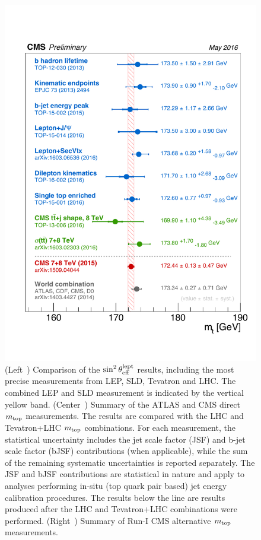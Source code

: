 \documentclass{blois}
\begin{document}
\begin{figure}
\begin{minipage}{0.25\linewidth}
\centerline{\includegraphics[width=1.00\linewidth]{figures/mtopComb_alt1}}
\end{minipage}
\caption[]{(Left~\cite{bib:LHCb-fb-asymmetry}) Comparison of the $\sin^2\theta_{\rm eff}^{\rm lept}$ results, including
the most precise measurements from LEP, SLD, Tevatron and LHC. The combined LEP and
SLD measurement is indicated by the vertical yellow band.
(Center~\cite{bib:LHCTopWG-topMass}) Summary of the ATLAS and CMS direct $m_{\rm top}$ measurements. The
results are compared with the LHC and Tevatron+LHC $m_{\rm top}$ combinations.
For each measurement, the statistical uncertainty includes the jet scale factor
(JSF) and b-jet scale factor (bJSF) contributions (when applicable), while the
sum of the remaining systematic uncertainties is reported separately. The JSF
and bJSF contributions are statistical in nature and apply to analyses performing
in-situ (top quark pair based) jet energy calibration procedures. The results
below the line are results produced after the LHC and Tevatron+LHC combinations
were performed.
(Right~\cite{bib:CMS-topMassAlternative}) Summary of Run-I CMS alternative $m_{\rm top}$ measurements.}
\label{fig:theFigure}
\end{figure}
\end{document}
